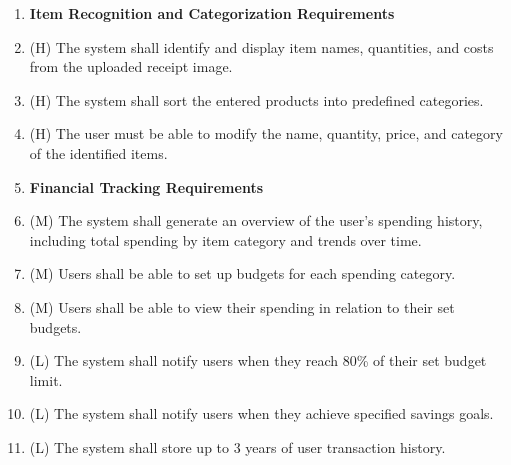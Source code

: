 \documentclass[12pt]{article}
\begin{document}
\begin{enumerate}[label=FR\arabic*]
  \item[] \textbf{Item Recognition and Categorization Requirements}
  \item (H) The system shall identify and display item names, quantities, and costs
  from the uploaded receipt image.
  \item (H) The system shall sort the entered products into predefined categories.
  \item (H) The user must be able to modify the name, quantity, price, and category
  of the identified items.   

  \item[] \textbf{Financial Tracking Requirements}
  \item (M) The system shall generate an overview of the user's spending history,
  including total spending by item category and trends over time.
  \item (M) Users shall be able to set up budgets for each spending category.
  \item (M) Users shall be able to view their spending in relation to their set
  budgets.
  \item (L) The system shall notify users when they reach 80\% of their set budget
  limit.
  \item (L) The system shall notify users when they achieve specified savings goals.
  \item (L) The system shall store up to 3 years of user transaction history.
\end{enumerate}

\newpage
\end{document}

